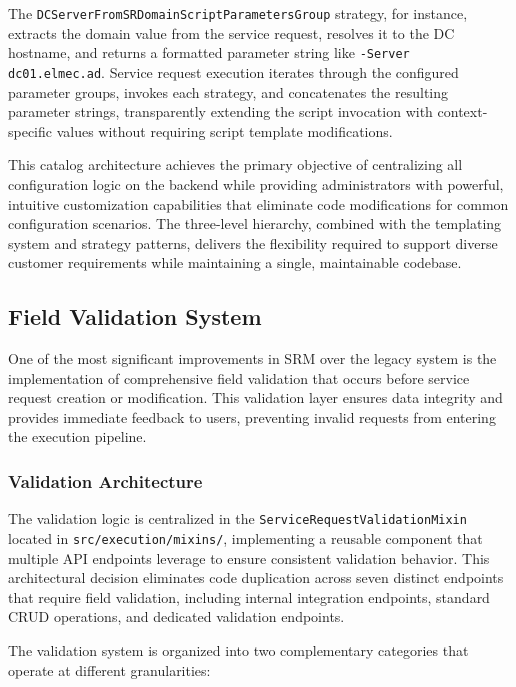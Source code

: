 The \texttt{DCServerFromSRDomainScriptParametersGroup} strategy, for instance, extracts the domain value from the service request, resolves it to the DC hostname, and returns a formatted parameter string like \texttt{-Server dc01.elmec.ad}. Service request execution iterates through the configured parameter groups, invokes each strategy, and concatenates the resulting parameter strings, transparently extending the script invocation with context-specific values without requiring script template modifications.

This catalog architecture achieves the primary objective of centralizing all configuration logic on the backend while providing administrators with powerful, intuitive customization capabilities that eliminate code modifications for common configuration scenarios. The three-level hierarchy, combined with the templating system and strategy patterns, delivers the flexibility required to support diverse customer requirements while maintaining a single, maintainable codebase.

\subsection{Field Validation System}

One of the most significant improvements in SRM over the legacy system is the implementation of comprehensive field validation that occurs before service request creation or modification. This validation layer ensures data integrity and provides immediate feedback to users, preventing invalid requests from entering the execution pipeline.

\subsubsection{Validation Architecture}

The validation logic is centralized in the \texttt{ServiceRequestValidationMixin} located in \texttt{src/execution/mixins/}, implementing a reusable component that multiple API endpoints leverage to ensure consistent validation behavior. This architectural decision eliminates code duplication across seven distinct endpoints that require field validation, including internal integration endpoints, standard CRUD operations, and dedicated validation endpoints.

The validation system is organized into two complementary categories that operate at different granularities:

